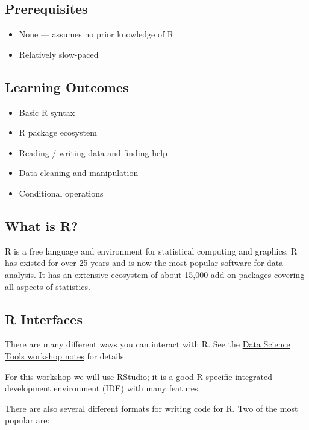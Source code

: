 \documentclass[]{book}
\providecommand{\tightlist}{%
  \setlength{\itemsep}{0pt}\setlength{\parskip}{0pt}}
\begin{document}
\subsection{Prerequisites}\label{prerequisites}

\begin{itemize}
\tightlist
\item
  None --- assumes no prior knowledge of R
\item
  Relatively slow-paced
\end{itemize}

\subsection{Learning Outcomes}\label{learning-outcomes}

\begin{itemize}
\tightlist
\item
  Basic R syntax
\item
  R package ecosystem
\item
  Reading / writing data and finding help
\item
  Data cleaning and manipulation
\item
  Conditional operations
\end{itemize}

\subsection{What is R?}\label{what-is-r}

R is a free language and environment for statistical computing and
graphics. R has existed for over 25 years and is now the most popular
software for data analysis. It has an extensive ecosystem of about
15,000 add on packages covering all aspects of statistics.

\subsection{R Interfaces}\label{r-interfaces}

There are many different ways you can interact with R. See the
\href{./DataScienceTools.html}{Data Science Tools workshop notes} for
details.

For this workshop we will use \href{https://rstudio.com/}{RStudio}; it
is a good R-specific integrated development environment (IDE) with many
features.

There are also several different formats for writing code for R. Two of
the most popular are:
\end{document}
